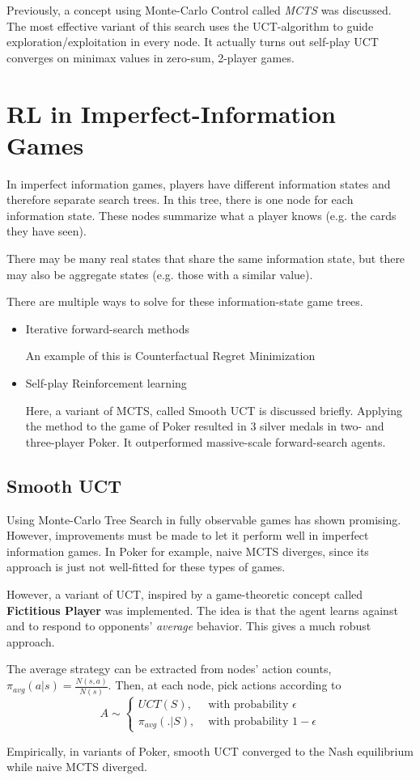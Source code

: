 Previously, a concept using Monte-Carlo Control called \textit{MCTS} was discussed. The most effective variant of this search uses the UCT-algorithm to guide exploration/exploitation in every node. It actually turns out self-play UCT converges on minimax values in zero-sum, 2-player games.

\section{RL in Imperfect-Information Games}

In imperfect information games, players have different information states and therefore separate search trees. In this tree, there is one node for each information state. These nodes summarize what a player knows (e.g. the cards they have seen).

There may be many real states that share the same information state, but there may also be aggregate states (e.g. those with a similar value).

There are multiple ways to solve for these information-state game trees.
\begin{itemize}
	\item Iterative forward-search methods 
	
	An example of this is Counterfactual Regret Minimization
	\item Self-play Reinforcement learning
	
	Here, a variant of MCTS, called Smooth UCT is discussed briefly. Applying the method to the game of Poker resulted in 3 silver medals in two- and three-player Poker. It outperformed massive-scale forward-search agents.
\end{itemize}

\subsection{Smooth UCT}

Using Monte-Carlo Tree Search in fully observable games has shown promising. However, improvements must be made to let it perform well in imperfect information games. In Poker for example, naive MCTS diverges, since its approach is just not well-fitted for these types of games.

However, a variant of UCT, inspired by a game-theoretic concept called \textbf{Fictitious Player} was implemented. The idea is that the agent learns against and to respond to opponents' \textit{average} behavior. This gives a much robust approach.

The average strategy can be extracted from nodes' action counts, $\pi_{avg}(a | s) = \frac{N(s, a)}{N(s)}$. Then, at each node, pick actions according to
\begin{equation*}
	A \sim \begin{cases}
		UCT(S), & \text{ with probability } \epsilon\\
		\pi_{avg}(.|S), & \text{ with probability } 1 - \epsilon
	\end{cases}
\end{equation*}

Empirically, in variants of Poker, smooth UCT converged to the Nash equilibrium while naive MCTS diverged.

